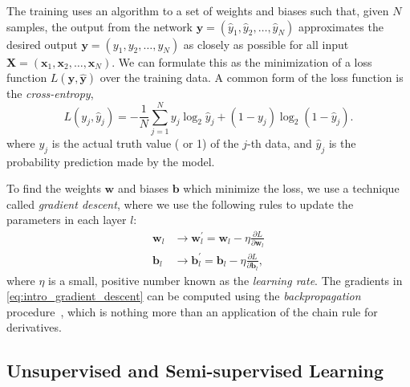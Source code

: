 The training uses an algorithm to a set of weights and biases such that, given $N$ samples, the output from the network
$\mathbf{y}=\left(\hat{y}_1, \hat{y}_2, \dots, \hat{y}_N \right)$
approximates the desired output
$\mathbf{y} = \left(y_1, y_2, \dots, y_N \right)$
as closely as possible for all input
$\mathbf{X}=\left(\mathbf{x}_1,\mathbf{x}_2,\dots,\mathbf{x}_N\right)$.
We can formulate this as the minimization of a loss function $L(\mathbf{y},\hat{\mathbf{y}})$ over the training data.
A common form of the loss function is the \textit{cross-entropy},
\begin{equation}
  L(y_j, \hat{y}_j) = - \frac{1}{N} \sum_{j=1}^{N} y_j  \log_2 \hat{y}_j
    + (1 - y_j)  \log_2 (1 - \hat{y}_j).
  \label{eq:intro_cross_entropy}
\end{equation}
where $y_j$ is the actual truth value ( or 1) of the $j$-th data, and
$\hat{y}_j$ is the probability prediction made by the model.

To find the weights $\mathbf{w}$ and biases $\mathbf{b}$ which minimize the loss,
we use a technique called \textit{gradient descent},
where we use the following rules to update the parameters in each layer $l$:
\begin{align}
  \mathbf{w}_l &\rightarrow
  \mathbf{w}_l^{\prime}
  = \mathbf{w}_l - \eta \frac{\partial L}{\partial \mathbf{w}_l} \nonumber \\
  \mathbf{b}_l &\rightarrow
  \mathbf{b}_l^{\prime}
  = \mathbf{b}_l - \eta \frac{\partial L}{\partial \mathbf{b}_l},
  \label{eq:intro_gradient_descent}
\end{align}
where $\eta$ is a small, positive number known as the \textit{learning rate}.
The gradients in \ref{eq:intro_gradient_descent} can be computed using the
\textit{backpropagation} procedure~\citep{rumelhart1988learning},
which is nothing more than an application of the chain rule for derivatives.

\subsection{Unsupervised and Semi-supervised Learning}

